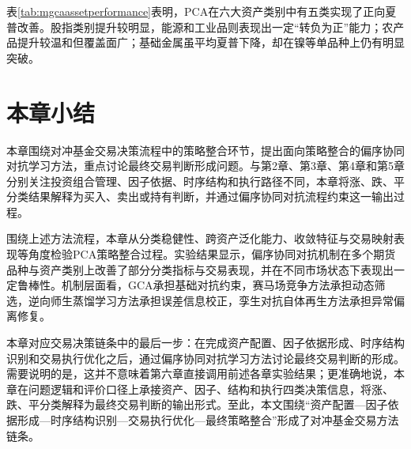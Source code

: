 表\ref{tab:mgcaassetperformance}表明，PCA在六大资产类别中有五类实现了正向夏普改善。股指类别提升较明显，能源和工业品则表现出一定“转负为正”能力；农产品提升较温和但覆盖面广；基础金属虽平均夏普下降，却在镍等单品种上仍有明显突破。


\section{本章小结}

本章围绕对冲基金交易决策流程中的策略整合环节，提出面向策略整合的偏序协同对抗学习方法，重点讨论最终交易判断形成问题。与第2章、第3章、第4章和第5章分别关注投资组合管理、因子依据、时序结构和执行路径不同，本章将涨、跌、平分类结果解释为买入、卖出或持有判断，并通过偏序协同对抗流程约束这一输出过程。

围绕上述方法流程，本章从分类稳健性、跨资产泛化能力、收敛特征与交易映射表现等角度检验PCA策略整合过程。实验结果显示，偏序协同对抗机制在多个期货品种与资产类别上改善了部分分类指标与交易表现，并在不同市场状态下表现出一定鲁棒性。机制层面看，GCA承担基础对抗约束，赛马场竞争方法承担动态筛选，逆向师生蒸馏学习方法承担误差信息校正，孪生对抗自体再生方法承担异常偏离修复。

本章对应交易决策链条中的最后一步：在完成资产配置、因子依据形成、时序结构识别和交易执行优化之后，通过偏序协同对抗学习方法讨论最终交易判断的形成。需要说明的是，这并不意味着第六章直接调用前述各章实验结果；更准确地说，本章在问题逻辑和评价口径上承接资产、因子、结构和执行四类决策信息，将涨、跌、平分类解释为最终交易判断的输出形式。至此，本文围绕“资产配置—因子依据形成—时序结构识别—交易执行优化—最终策略整合”形成了对冲基金交易方法链条。
